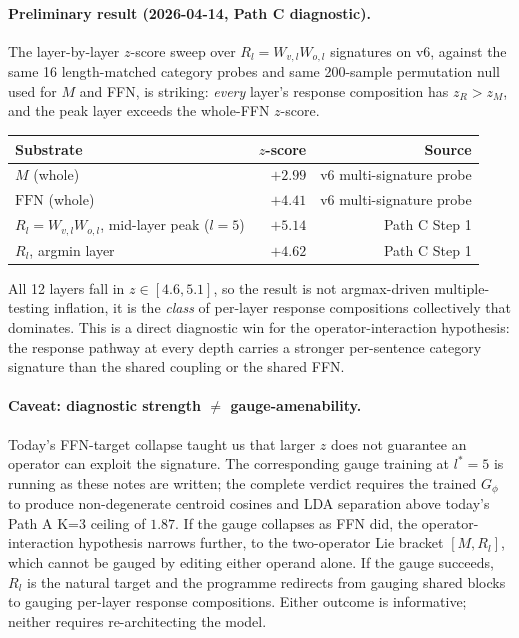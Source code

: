 \documentclass[11pt, a4paper]{article}
\theoremstyle{plain}
\theoremstyle{definition}
\theoremstyle{remark}
\begin{document}
\paragraph{Preliminary result (2026-04-14, Path C diagnostic).}
The layer-by-layer $z$-score sweep over $R_l = W_{v,l} W_{o,l}$ signatures on v6, against the same 16 length-matched category probes and same 200-sample permutation null used for $M$ and FFN, is striking:
\emph{every} layer's response composition has $z_R > z_M$, and the peak layer exceeds the whole-FFN $z$-score.
\begin{center}
\small
\begin{tabular}{lrr}
\toprule
Substrate & $z$-score & Source \\
\midrule
$M$ (whole)                  & $+2.99$ & v6 multi-signature probe \\
$\mathrm{FFN}$ (whole)       & $+4.41$ & v6 multi-signature probe \\
$R_l = W_{v,l} W_{o,l}$, mid-layer peak ($l{=}5$) & $+5.14$ & Path C Step 1 \\
$R_l$, argmin layer         & $+4.62$ & Path C Step 1 \\
\bottomrule
\end{tabular}
\end{center}
All 12 layers fall in $z \in [4.6, 5.1]$, so the result is not argmax-driven multiple-testing inflation, it is the \emph{class} of per-layer response compositions collectively that dominates.
This is a direct diagnostic win for the operator-interaction hypothesis: the response pathway at every depth carries a stronger per-sentence category signature than the shared coupling or the shared FFN.

\paragraph{Caveat: diagnostic strength $\neq$ gauge-amenability.}
Today's FFN-target collapse taught us that larger $z$ does not guarantee an operator can exploit the signature.
The corresponding gauge training at $l^{*}{=}5$ is running as these notes are written; the complete verdict requires the trained $G_\phi$ to produce non-degenerate centroid cosines and LDA separation above today's Path A K=3 ceiling of $1.87$.
If the gauge collapses as FFN did, the operator-interaction hypothesis narrows further, to the two-operator Lie bracket $[M, R_l]$, which cannot be gauged by editing either operand alone.
If the gauge succeeds, $R_l$ is the natural target and the programme redirects from gauging shared blocks to gauging per-layer response compositions.
Either outcome is informative; neither requires re-architecting the model.
\end{document}
